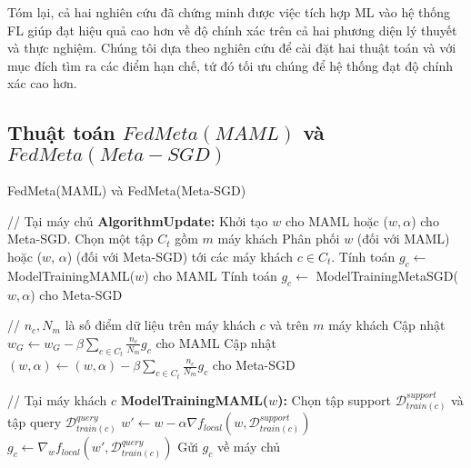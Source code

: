 Tóm lại, cả hai nghiên cứu \parencite{chen2018federated, fallah2020personalized} đã chứng minh được việc tích hợp ML vào hệ thống FL giúp đạt hiệu quả cao hơn  về độ chính xác trên cả hai phương diện lý thuyết và thực nghiệm. Chúng tôi dựa theo nghiên cứu \cite{chen2018federated} để cài đặt hai thuật toán  và  với mục đích tìm ra các điểm hạn chế, tứ đó tối ưu chúng để hệ thống đạt độ chính xác cao hơn.

\subsection{Thuật toán $FedMeta(MAML)$ và $FedMeta(Meta-SGD)$}

\begin{algorithm}[H]
    \caption{FedMeta(MAML) và FedMeta(Meta-SGD) \cite{chen2018federated}} \label{alg:fedmeta}
    \begin{algorithmic}[1]
        \State // Tại máy chủ
        \State \textbf{AlgorithmUpdate:}
        \State Khởi tạo $w$ cho MAML hoặc ($w, \alpha$) cho Meta-SGD.
            \State Chọn một tập $C_t$ gồm $m$ máy khách
            \State Phân phối $w$ (đối với MAML) hoặc ($w$, $\alpha$) (đối với Meta-SGD) tới các máy khách $c\in C_t$.
                \State Tính toán $g_c \gets$ ModelTrainingMAML($w$) cho MAML
                \State Tính toán $g_c \gets$ ModelTrainingMetaSGD($w, \alpha$) cho Meta-SGD
            \EndFor

            \State
            \State // $n_c, N_m$ là số điểm dữ liệu trên máy khách $c$ và trên $m$ máy khách
            \State Cập nhật $w_G \gets w_G - \beta \sum_{c \in C_t} \frac{n_c}{N_m} g_c$ cho MAML
            \State Cập nhật $(w, \alpha) \gets (w, \alpha) - \beta \sum_{c \in C_t} \frac{n_c}{N_m} g_c$ cho Meta-SGD
        \EndFor

        \State

        \State // Tại máy khách $c$
        \State\textbf{ModelTrainingMAML($w$):}
        \State Chọn tập support $\mathcal{D}_{train(c)}^{support}$ và tập query $\mathcal{D}_{train(c)}^{query}$
        \State $w' \gets w - \alpha\nabla f_{local}(w, \mathcal{D}_{train(c)}^{support})$
        \State $g_c \gets \nabla_w f_{local}(w', \mathcal{D}_{train(c)}^{query})$
        \State Gửi $g_c$ về máy chủ


\end{algorithmic}
\end{algorithm}
